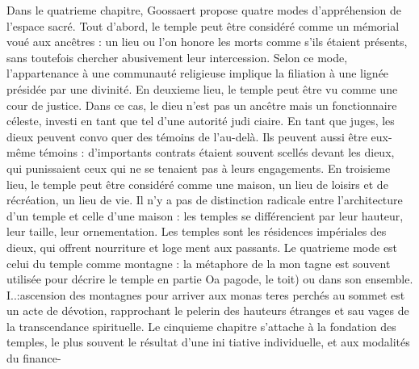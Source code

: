 Dans le quatrieme chapitre, Goossaert propose quatre modes d'appréhension de l'espace sacré. Tout d'abord, le temple peut être considéré comme un mémorial voué aux ancêtres : un lieu ou l'on honore les morts comme s'ils étaient présents, sans toutefois chercher abusivement leur intercession. Selon ce mode, l'appartenance à une communauté religieuse implique la filiation à une lignée présidée par une divinité. En deuxieme lieu, le temple peut être vu comme une cour de justice. Dans ce cas, le dieu n'est pas un ancêtre mais un fonctionnaire céleste, investi en tant que tel d'une autorité judi­ ciaire. En tant que juges, les dieux peuvent convo­ quer des témoins de l'au-delà. Ils peuvent aussi être eux-même témoins : d'importants contrats étaient souvent scellés devant les dieux, qui punissaient ceux qui ne se tenaient pas à leurs engagements. En troisieme lieu, le temple peut être considéré comme une maison, un lieu de loisirs et de récréation, un lieu de vie. Il n'y a pas de distinction radicale entre l'architecture d'un temple et celle d'une maison : les temples se différencient par leur hauteur, leur taille, leur ornementation. Les temples sont les résidences impériales des dieux, qui offrent nourriture et loge­ ment aux passants. Le quatrieme mode est celui du temple comme montagne : la métaphore de la mon­ tagne est souvent utilisée pour décrire le temple en partie Oa pagode, le toit) ou dans son ensemble. I..:ascension des montagnes pour arriver aux monas­ teres perchés au sommet est un acte de dévotion, rapprochant le pelerin des hauteurs étranges et sau­ vages de la transcendance spirituelle.
Le cinquieme chapitre s'attache à la fondation
des temples, le plus souvent le résultat d'une ini­ tiative individuelle, et aux modalités du finance-
 





